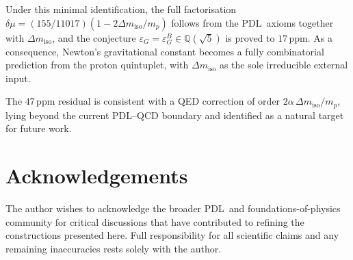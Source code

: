 \documentclass[11pt,a4paper]{article}
\theoremstyle{definition}
\newcommand{\PDL}{\textnormal{PDL}}
\newcommand{\epsg}{\varepsilon_G}
\newcommand{\epsgB}{\varepsilon_G^B}
\newcommand{\dmu}{\delta\mu}
\newcommand{\dmiso}{\Delta m_{\mathrm{iso}}}
\begin{document}
Under this minimal identification, the full factorisation $\dmu = (155/11017)(1-2\dmiso/m_p)$ follows from the \PDL\ axioms together with $\dmiso$, and the conjecture $\epsg = \epsgB \in \mathbb{Q}(\sqrt{5})$ is proved to $17\,\mathrm{ppm}$. As a consequence, Newton's gravitational constant becomes a fully combinatorial prediction from the proton quintuplet, with $\dmiso$ as the sole irreducible external input.

The $47\,\mathrm{ppm}$ residual is consistent with a QED correction of order $2\alpha\,\dmiso/m_p$, lying beyond the current \PDL--QCD boundary and identified as a natural target for future work.

\section*{Acknowledgements}

The author wishes to acknowledge the broader \PDL\ and foundations-of-physics community for critical discussions that have contributed to refining the constructions presented here. Full responsibility for all scientific claims and any remaining inaccuracies rests solely with the author.



\end{document}

